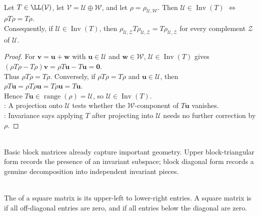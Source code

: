 \begin{proposition} \label{prop:invariant-subspace-projection-criterion} \\
Let $T\in\LL(\mathcal{V})$, let $\mathcal{V}=\mathcal{U}\oplus\mathcal{W}$, and let $\rho=\rho_{\mathcal{U},\mathcal{W}}$. Then $\mathcal{U}\in\operatorname{Inv}(T)$ $\Longleftrightarrow$ $\rho T\rho=T\rho$.\\
Consequently, if $\mathcal{U}\in\operatorname{Inv}(T)$, then $\rho_{\mathcal{U},\mathcal{Z}}T\rho_{\mathcal{U},\mathcal{Z}}=T\rho_{\mathcal{U},\mathcal{Z}}$ for every complement $\mathcal{Z}$ of $\mathcal{U}$.
\begin{proof}
For $\mathbf{v}=\mathbf{u}+\mathbf{w}$ with $\mathbf{u}\in\mathcal{U}$ and $\mathbf{w}\in\mathcal{W}$, $\mathcal{U}\in\operatorname{Inv}(T)$ gives $(\rho T\rho-T\rho)\mathbf{v}=\rho T\mathbf{u}-T\mathbf{u}=\mathbf{0}$.\\
Thus $\rho T\rho=T\rho$. Conversely, if $\rho T\rho=T\rho$ and $\mathbf{u}\in\mathcal{U}$, then $\rho T\mathbf{u}=\rho T\rho\mathbf{u}=T\rho\mathbf{u}=T\mathbf{u}$.\\
Hence $T\mathbf{u}\in\operatorname{range}(\rho)=\mathcal{U}$, so $\mathcal{U}\in\operatorname{Inv}(T)$.\\
: A projection onto $\mathcal{U}$ tests whether the $\mathcal{W}$-component of $T\mathbf{u}$ vanishes.\\
: Invariance says applying $T$ after projecting into $\mathcal{U}$ needs no further correction by $\rho$.
\end{proof}
\end{proposition}

\begin{perspective} \\
Basic block matrices already capture important geometry. Upper block-triangular form records the presence of an invariant subspace; block diagonal form records a genuine decomposition into independent invariant pieces.
\end{perspective}

\begin{definition} \label{def:diagonal-and-upper-triangular-matrices} \\
The  of a square matrix is its upper-left to lower-right entries. A square matrix is  if all off-diagonal entries are zero, and  if all entries below the diagonal are zero.
\end{definition}

